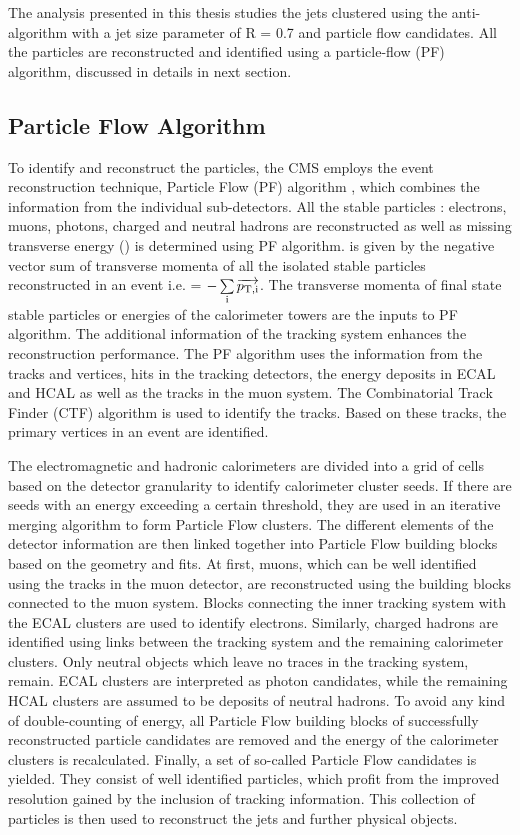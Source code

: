 The analysis presented in this thesis studies the jets clustered using the anti-\kt algorithm with a jet size parameter of R = 0.7 and particle flow candidates. All the particles are reconstructed and identified using a particle-flow (PF) algorithm, discussed in details in next section.

\subsection{Particle Flow Algorithm}
To identify and reconstruct the particles, the CMS employs the event reconstruction technique, Particle Flow (PF) algorithm \cite{CMS:2009nxa, CMS:2010byl}, which combines the information from the individual sub-detectors. All the stable particles : electrons, muons, photons, charged and neutral hadrons are reconstructed as well as missing transverse energy (\ETmiss) is determined using PF algorithm. \ETmiss is given by the negative vector sum of transverse momenta \pt of all the isolated stable particles reconstructed in an event i.e. \ETmiss = $-\sum\limits_{\rm i}^{}\overrightarrow{p_{\rm T,i}}$. %
The transverse momenta of final state stable particles or energies of the calorimeter towers are the inputs to PF algorithm. The additional information of the tracking system enhances the reconstruction performance. The PF algorithm uses the information from the tracks and vertices, hits in the tracking detectors, the energy deposits in ECAL and HCAL as well as the tracks in the muon system. The Combinatorial Track Finder (CTF) algorithm \cite{Adam:2005cg} is used to identify the tracks. Based on these tracks, the primary vertices in an event are identified. 

The electromagnetic and hadronic calorimeters are divided into a grid of cells based on the detector granularity to identify calorimeter cluster seeds. If there are seeds with an energy exceeding a certain threshold, they are used in an iterative merging algorithm to form Particle Flow clusters. The different elements of the detector information are then linked together into Particle Flow building blocks based on the geometry and fits. At first, muons, which can be well identified using the tracks in the muon detector, are reconstructed using the building blocks connected to the muon system. Blocks connecting the inner tracking system with the ECAL clusters are used to identify electrons. Similarly, charged hadrons are identified using links between the tracking system and the remaining calorimeter clusters. Only neutral objects which leave no traces in the tracking system, remain. ECAL clusters are interpreted as photon candidates, while the remaining HCAL clusters are assumed to be deposits of neutral hadrons. To avoid any kind of double-counting of energy, all Particle Flow building blocks of successfully reconstructed particle candidates are removed and the energy of the calorimeter clusters is recalculated. Finally, a set of so-called Particle Flow candidates is yielded. They consist of well identified particles, which profit from the improved resolution gained by the inclusion of tracking information. This collection of particles is then used to reconstruct the jets and further physical objects.

